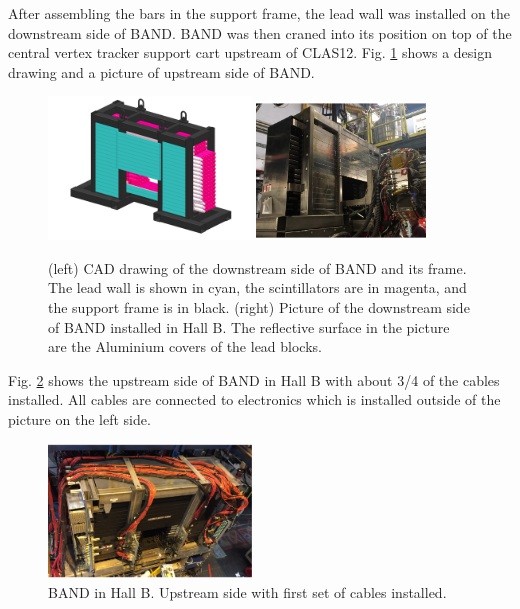 \documentclass[3p,final,twocolumn]{elsarticle}
\begin{document}
After assembling the bars in the support frame, the lead wall was
installed on the downstream side of BAND. BAND was then
craned into its position on top of the central vertex tracker support
cart upstream of CLAS12. Fig. \ref{fig:band_downstream} shows a
design drawing and a picture of upstream side of BAND. 
\begin{figure}[th]
	\centering
	\includegraphics[width=0.48\textwidth]{BAND_1-2.png} 
	\includegraphics[width=0.40\textwidth]{pic-bandinhall1.pdf}
		\caption{(left) CAD drawing of the downstream side of BAND and its frame. The lead wall is shown in cyan, the scintillators
          are in magenta, and the support frame is in black. (right) Picture of the downstream side of BAND installed in Hall B. The reflective surface in the picture are the Aluminium covers of the lead blocks.}
		\label{fig:band_downstream}
\end{figure}

Fig. \ref{fig:bandinhall} shows the upstream side of BAND in Hall B with about 3/4 of the cables installed. All cables are connected to
electronics which is installed outside of the picture on the left side.
\begin{figure}[tb]
	\centering
	\includegraphics[width=0.48\textwidth]{pic-bandinhall2.pdf}
				\caption{BAND in Hall B. Upstream side with first set of cables installed.}
		\label{fig:bandinhall}
\end{figure}
\end{document}

